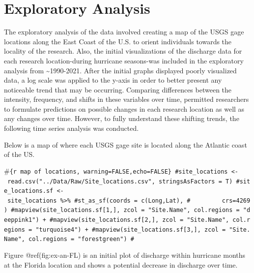 \documentclass[
  12pt,
]{article}
\begin{document}
\newpage

\hypertarget{exploratory-analysis}{%
\section{Exploratory Analysis}\label{exploratory-analysis}}

The exploratory analysis of the data involved creating a map of the USGS
gage locations along the East Coast of the U.S. to orient individuals
towards the locality of the research. Also, the initial visualizations
of the discharge data for each research location-during hurricane
seasons-was included in the exploratory analysis from
\textasciitilde1990-2021. After the initial graphs displayed poorly
visualized data, a log scale was applied to the y-axis in order to
better present any noticeable trend that may be occurring. Comparing
differences between the intensity, frequency, and shifts in these
variables over time, permitted researchers to formulate predictions on
possible changes in each research location as well as any changes over
time. However, to fully understand these shifting trends, the following
time series analysis was conducted.

Below is a map of where each USGS gage site is located along the
Atlantic coast of the US.

\#\texttt{\{r\ map\ of\ locations,\ warning=FALSE,echo=FALSE\}\ \#site\_locations\ \textless{}-\ read.csv("../Data/Raw/Site\_locations.csv",\ stringsAsFactors\ =\ T)\ \#site\_locations.sf\ \textless{}-\ site\_locations\ \%\textgreater{}\%\ \#st\_as\_sf(coords\ =\ c(\textquotesingle{}Long\textquotesingle{},\textquotesingle{}Lat\textquotesingle{}),\ \#\ \ \ \ \ \ \ \ \ crs=4269)\ \#mapview(site\_locations.sf{[}1,{]},\ zcol\ =\ "Site.Name",\ col.regions\ =\ "deeppink1")\ +\ \#mapview(site\_locations.sf{[}2,{]},\ zcol\ =\ "Site.Name",\ col.regions\ =\ "turquoise4")\ +\ \#mapview(site\_locations.sf{[}3,{]},\ zcol\ =\ "Site.Name",\ col.regions\ =\ "forestgreen")\ \#}

Figure @ref(fig:ex-an-FL) is an initial plot of discharge within
hurricane months at the Florida location and shows a potential decrease
in discharge over time.
\end{document}
